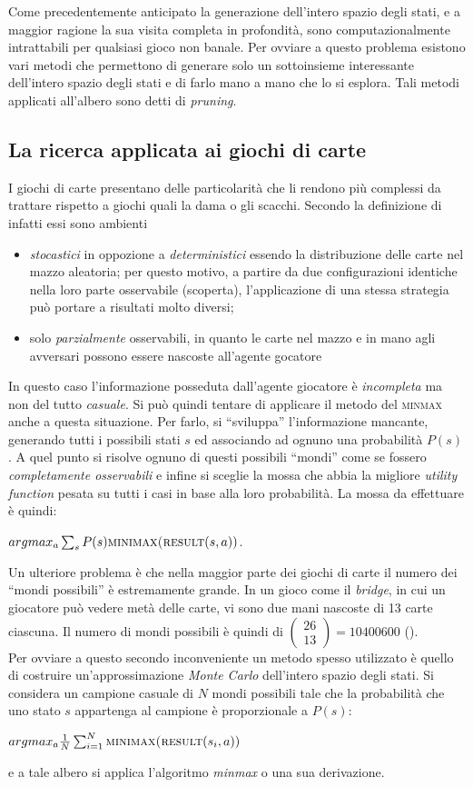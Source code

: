 Come precedentemente anticipato la generazione dell'intero spazio degli stati, e a maggior ragione la sua visita completa in profondità, sono computazionalmente intrattabili per qualsiasi gioco non banale.
Per ovviare a questo problema esistono vari metodi che permettono di generare solo un sottoinsieme interessante dell'intero spazio degli stati e di farlo mano a mano che lo si esplora. Tali metodi applicati all'albero sono detti di \emph{pruning}.

\subsection{La ricerca applicata ai giochi di carte}

I giochi di carte presentano delle particolarità che li rendono più complessi da trattare rispetto a giochi quali la dama o gli scacchi.
Secondo la definizione di \cite{randw} infatti essi sono ambienti
\begin{itemize}
   \item \emph{stocastici} in oppozione a \emph{deterministici} essendo la distribuzione delle carte nel mazzo aleatoria; per questo motivo, a partire da due configurazioni identiche nella loro parte osservabile (scoperta), l'applicazione di una stessa strategia può portare a risultati molto diversi;
   \item solo \emph{parzialmente} osservabili, in quanto le carte nel mazzo e in mano agli avversari possono essere nascoste all'agente gocatore
\end{itemize}
In questo caso l'informazione posseduta dall'agente giocatore è \emph{incompleta} ma non del tutto \emph{casuale}.
Si può quindi tentare di applicare il metodo del \textsc{minmax} anche a questa situazione.
Per farlo, si ``sviluppa'' l'informazione mancante, generando tutti i possibili stati $s$ ed associando ad ognuno una probabilità $P(s)$.
A quel punto si risolve ognuno di questi possibili ``mondi'' come se fossero \emph{completamente osservabili} e infine si sceglie la mossa che abbia la migliore \emph{utility function} pesata su tutti i casi in base alla loro probabilità.
La mossa da effettuare è quindi:

\begin{center}
$ argmax_a \sum_{s} P(s) \textsc{minimax(result}(s,a)) $.\\
\end{center}
Un ulteriore problema è che nella maggior parte dei giochi di carte il numero dei ``mondi possibili'' è estremamente grande.
In un gioco come il \emph{bridge}, in cui un giocatore può vedere metà delle carte, vi sono due mani nascoste di 13 carte ciascuna.
Il numero di mondi possibili è quindi di $ \left(\! \begin{array}{c} 26 \\  13\end{array}\!\right)  = 10 400 600 $ (\cite{randw}).\\
Per ovviare a questo secondo inconveniente un metodo spesso utilizzato è quello di costruire un'approssimazione \emph{Monte Carlo} dell'intero spazio degli stati.
Si considera un campione casuale di $N$ mondi possibili tale che la probabilità che uno stato $s$ appartenga al campione è proporzionale a $P(s)$:

\begin{center}
$argmax_a \frac{1}{N} \sum_{i=1}^{N}  \textsc{minimax(result}(s_i,a)) $ \cite{randw}\\
\end{center}
e a tale albero si applica l'algoritmo \emph{minmax} o una sua derivazione.
